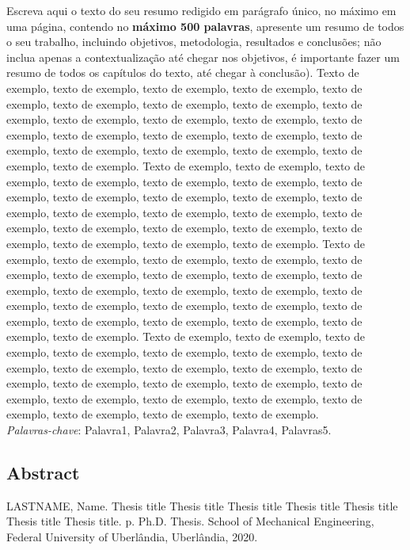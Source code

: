 Escreva aqui o texto do seu resumo redigido em parágrafo único, no máximo em uma página, contendo no \textbf{máximo 500 palavras}, apresente um resumo de todos o seu trabalho, incluindo objetivos, metodologia, resultados e conclusões; não inclua apenas a contextualização até chegar nos objetivos, é importante fazer um resumo de todos os capítulos do texto, até chegar à conclusão). Texto de exemplo, texto de exemplo, texto de exemplo, texto de exemplo, texto de exemplo, texto de exemplo, texto de exemplo, texto de exemplo, texto de exemplo, texto de exemplo, texto de exemplo, texto de exemplo, texto de exemplo, texto de exemplo, texto de exemplo, texto de exemplo, texto de exemplo, texto de exemplo, texto de exemplo, texto de exemplo, texto de exemplo, texto de exemplo. Texto de exemplo, texto de exemplo, texto de exemplo, texto de exemplo, texto de exemplo, texto de exemplo, texto de exemplo, texto de exemplo, texto de exemplo, texto de exemplo, texto de exemplo, texto de exemplo, texto de exemplo, texto de exemplo, texto de exemplo, texto de exemplo, texto de exemplo, texto de exemplo, texto de exemplo, texto de exemplo, texto de exemplo, texto de exemplo. Texto de exemplo, texto de exemplo, texto de exemplo, texto de exemplo, texto de exemplo, texto de exemplo, texto de exemplo, texto de exemplo, texto de exemplo, texto de exemplo, texto de exemplo, texto de exemplo, texto de exemplo, texto de exemplo, texto de exemplo, texto de exemplo, texto de exemplo, texto de exemplo, texto de exemplo, texto de exemplo, texto de exemplo, texto de exemplo. Texto de exemplo, texto de exemplo, texto de exemplo, texto de exemplo, texto de exemplo, texto de exemplo, texto de exemplo, texto de exemplo, texto de exemplo, texto de exemplo, texto de exemplo, texto de exemplo, texto de exemplo, texto de exemplo, texto de exemplo, texto de exemplo, texto de exemplo, texto de exemplo, texto de exemplo, texto de exemplo, texto de exemplo, texto de exemplo.
\\
\vspace{1cm}
\noindent
\emph{Palavras-chave}: Palavra1, Palavra2, Palavra3, Palavra4, Palavras5.\\
\clearpage
\begin{center}
	\chapter*{Abstract}
\end{center}
\vspace{24pt}
\noindent
LASTNAME, Name. Thesis title Thesis title Thesis title Thesis title Thesis title Thesis title Thesis title. \pageref{LastPage}p. Ph.D. Thesis. School of Mechanical Engineering, Federal University of Uberlândia, Uberlândia, 2020.\\

